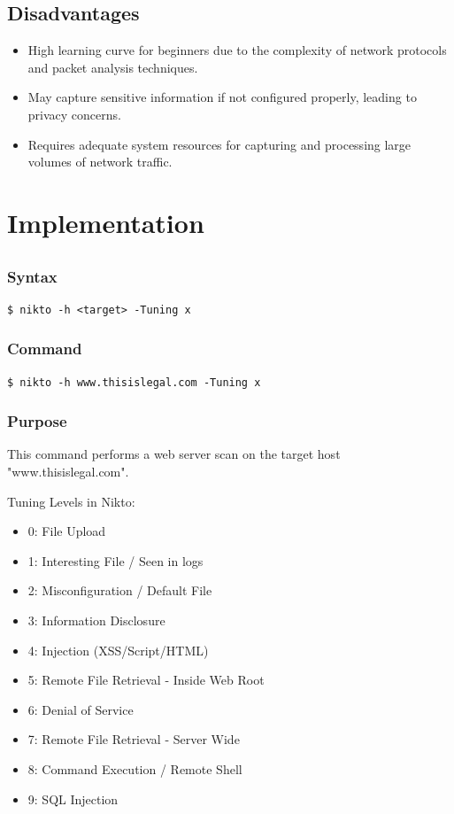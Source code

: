 \documentclass[11pt]{article}
\begin{document}
\subsection{Disadvantages}
\begin{itemize}
    \item High learning curve for beginners due to the complexity of network protocols and packet analysis techniques.
    \item May capture sensitive information if not configured properly, leading to privacy concerns.
    \item Requires adequate system resources for capturing and processing large volumes of network traffic.
\end{itemize}

\section{Implementation}

\subsection{}

\subsubsection*{Syntax}
\begin{verbatim}
$ nikto -h <target> -Tuning x
\end{verbatim}

\subsubsection*{Command}
\begin{verbatim}
$ nikto -h www.thisislegal.com -Tuning x
\end{verbatim}

\subsubsection*{Purpose}
This command performs a web server scan on the target host "www.thisislegal.com".

Tuning Levels in Nikto:
\begin{itemize}
    \item 0: File Upload
    \item 1: Interesting File / Seen in logs
    \item 2: Misconfiguration / Default File
    \item 3: Information Disclosure
    \item 4: Injection (XSS/Script/HTML)
    \item 5: Remote File Retrieval - Inside Web Root
    \item 6: Denial of Service
    \item 7: Remote File Retrieval - Server Wide
    \item 8: Command Execution / Remote Shell
    \item 9: SQL Injection
\end{itemize}
\end{document}
